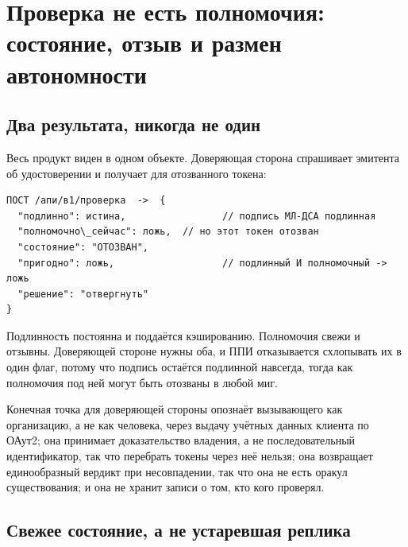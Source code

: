 \section{Проверка не есть полномочия: состояние, отзыв и размен автономности}
\label{sec:authorization}



\subsection{Два результата, никогда не один}

Весь продукт виден в одном объекте. Доверяющая сторона спрашивает эмитента об удостоверении и
получает для отозванного токена:

\begin{lstlisting}
ПОСТ /апи/в1/проверка  ->  {
  "подлинно": истина,                 // подпись МЛ-ДСА подлинная
  "полномочно\_сейчас": ложь,  // но этот токен отозван
  "состояние": "ОТОЗВАН",
  "пригодно": ложь,                   // подлинный И полномочный -> ложь
  "решение": "отвергнуть"
}
\end{lstlisting}

Подлинность постоянна и поддаётся кэшированию. Полномочия свежи и отзывны. Доверяющей стороне
нужны оба, и ППИ отказывается схлопывать их в один флаг, потому что подпись остаётся подлинной
навсегда, тогда как полномочия под ней могут быть отозваны в любой миг. \sImpl

Конечная точка для доверяющей стороны опознаёт вызывающего как организацию, а не как человека,
через выдачу учётных данных клиента по ОАут2; она принимает доказательство владения, а не
последовательный идентификатор, так что перебрать токены через неё нельзя; она возвращает
единообразный вердикт при несовпадении, так что она не есть оракул существования; и она не хранит
записи о том, кто кого проверял. \sImpl

\subsection{Свежее состояние, а не устаревшая реплика}

